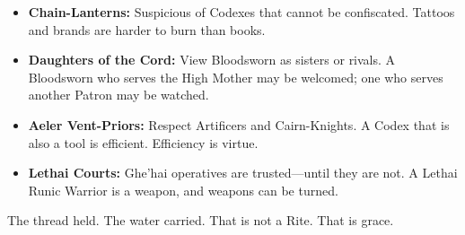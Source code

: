 \begin{itemize}
\item \textbf{Chain-Lanterns:} Suspicious of Codexes that cannot be confiscated. Tattoos and brands are harder to burn than books.
\item \textbf{Daughters of the Cord:} View Bloodsworn as sisters or rivals. A Bloodsworn who serves the High Mother may be welcomed; one who serves another Patron may be watched.
\item \textbf{Aeler Vent-Priors:} Respect Artificers and Cairn-Knights. A Codex that is also a tool is efficient. Efficiency is virtue.
\item \textbf{Lethai Courts:} Ghe'hai operatives are trusted—until they are not. A Lethai Runic Warrior is a weapon, and weapons can be turned.
\end{itemize}

The thread held. The water carried. That is not a Rite. That is grace.
